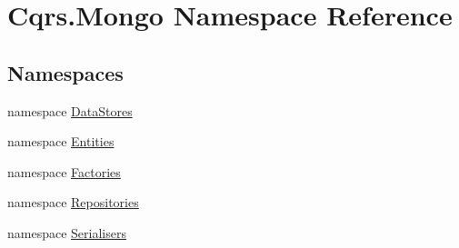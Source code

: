 \hypertarget{namespaceCqrs_1_1Mongo}{}\section{Cqrs.\+Mongo Namespace Reference}
\label{namespaceCqrs_1_1Mongo}
\subsection*{Namespaces}
\begin{DoxyCompactItemize}
\item 
namespace \hyperlink{namespaceCqrs_1_1Mongo_1_1DataStores}{Data\+Stores}
\item 
namespace \hyperlink{namespaceCqrs_1_1Mongo_1_1Entities}{Entities}
\item 
namespace \hyperlink{namespaceCqrs_1_1Mongo_1_1Factories}{Factories}
\item 
namespace \hyperlink{namespaceCqrs_1_1Mongo_1_1Repositories}{Repositories}
\item 
namespace \hyperlink{namespaceCqrs_1_1Mongo_1_1Serialisers}{Serialisers}
\end{DoxyCompactItemize}

